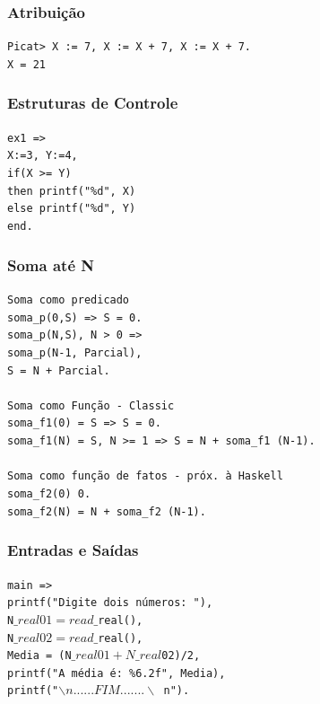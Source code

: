 \documentclass{beamer}
\begin{document}

\begin{frame}
    \frametitle{Atribuição}
     \texttt{Picat> X := 7, X := X + 7, X := X + 7.}\\
     \texttt{X = 21}
\end{frame}


\begin{frame}
    \frametitle{Estruturas de Controle}
     \texttt{ex1 =>}\\
     \texttt{X:=3, Y:=4,}\\
     \texttt{if(X >= Y)}\\
     \texttt{then printf("\%d", X)}\\
     \texttt{else printf("\%d", Y)}\\
     \texttt{end.}
\end{frame}


\begin{frame}
    \frametitle{Soma até N}
    \texttt{Soma como predicado}\\
    \texttt{soma\_p(0,S) => S = 0.}\\
    \texttt{soma\_p(N,S), N > 0 =>}\\
    \texttt{\qquad \qquad \qquad \qquad \qquad soma\_p(N-1, Parcial),}\\
    \texttt{\qquad \qquad \qquad \qquad \qquad S = N + Parcial.}\\
		\texttt{}\\
		\texttt{Soma como Função - Classic}\\
		\texttt{soma\_f1(0) = S => S = 0.}\\
		\texttt{soma\_f1(N) = S, N >= 1 => S = N + soma\_f1 (N-1).}\\
		\texttt{}\\
		\texttt{Soma como função de fatos - próx. à Haskell}\\
		\texttt{soma\_f2(0) 0.}\\
		\texttt{soma\_f2(N) = N + soma\_f2 (N-1).}\\
\end{frame}


\begin{frame}
    \frametitle{Entradas e Saídas}
    \texttt{main =>}\\
    \texttt{printf("Digite dois números: "),}\\
    \texttt{N$\_real01 = read\_$real(),}\\
    \texttt{N$\_real02 = read\_$real(),}\\
    \texttt{Media = (N$\_real01+N\_real$02)/2,}\\
    \texttt{printf("A média é: \%6.2f", Media),}\\
    \texttt{printf("$\backslash n ......FIM....... \backslash$ n").}
\end{frame}
\end{document}
